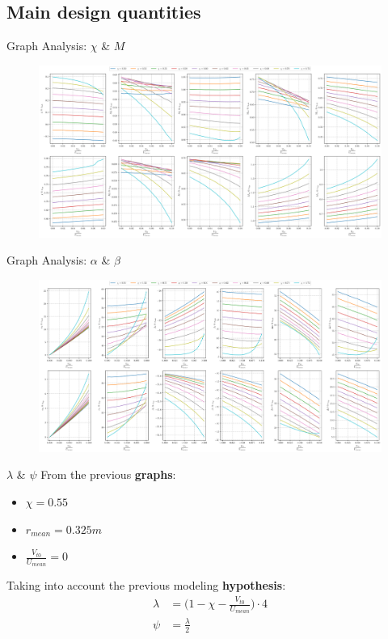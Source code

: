\subsection{Main design quantities}
	\begin{frame}{Graph Analysis: $\chi$ \& $M$}
		\begin{figure}
			\centering
			\includegraphics[width=\textwidth]{figures/reactionStudy0.png}
		\end{figure}
	\end{frame}
	\begin{frame}{Graph Analysis: $\alpha$ \& $\beta$}
		\begin{figure}
			\centering
			\includegraphics[width=\textwidth]{figures/reactionStudy1.png}
		\end{figure}
	\end{frame}
	\begin{frame}{$\lambda$ \& $\psi$}
		From the previous \textbf{graphs}:
			\begin{itemize}
				\item $\chi = 0.55$
				\item $r_{mean} = 0.325 m$
				\item $\frac{V_{t0}}{U_{mean}} = 0$
			\end{itemize}
		Taking into account the previous modeling \textbf{hypothesis}:
		\begin{align}
			\lambda & = \Bigg( 1 - \chi - \frac{V_{t0}}{U_{mean}} \Bigg) \cdot 4 \nonumber \\
			\psi    & = \frac{\lambda}{2} \nonumber
		\end{align}
	\end{frame}
	
